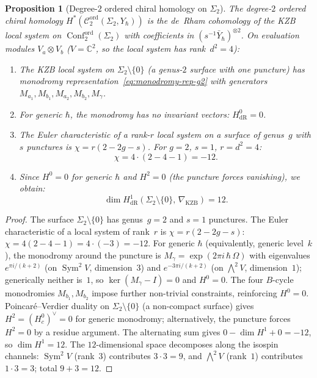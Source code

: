 \documentclass[11pt,reqno]{amsart}
\newtheorem{proposition}[theorem]{Proposition}
\theoremstyle{definition}
\theoremstyle{remark}
\newcommand{\cC}{\mathcal{C}}
\DeclareMathOperator{\Conf}{Conf}
\newcommand{\CC}{\mathbb{C}}
\numberwithin{equation}{section}
\begin{document}
\begin{proposition}[Degree-$2$ ordered chiral homology on
$\Sigma_2$]
\label{prop:g2-degree2}
The degree-$2$ ordered chiral homology
$H^*(\cC_2^{\mathrm{ord}}(\Sigma_2, Y_\hbar))$ is the
de~Rham cohomology of the KZB local system on
$\Conf_2^{\mathrm{ord}}(\Sigma_2)$ with coefficients in
$(s^{-1}\bar{Y}_\hbar)^{\otimes 2}$.
On evaluation modules $V_a \otimes V_b$
\textup{(}$V = \CC^2$, so the local system has
rank~$d^2 = 4$\textup{)}:
\begin{enumerate}[label=\textup{(\roman*)}]
\item The KZB local system on
  $\Sigma_2 \setminus \{0\}$ \textup{(}a genus-$2$ surface
  with one puncture\textup{)} has monodromy
  representation~\eqref{eq:monodromy-rep-g2} with generators
  $M_{a_1}, M_{b_1}, M_{a_2}, M_{b_2}, M_\gamma$.
\item For generic $\hbar$, the monodromy has no invariant
  vectors: $H^0_{\mathrm{dR}} = 0$.
\item The Euler characteristic of a rank-$r$ local system on
  a surface of genus~$g$ with $s$ punctures is
  $\chi = r(2 - 2g - s)$. For $g = 2$, $s = 1$,
  $r = d^2 = 4$:
  \begin{equation}\label{eq:g2-degree2-euler}
    \chi = 4 \cdot (2 - 4 - 1) = -12.
  \end{equation}
\item Since $H^0 = 0$ for generic $\hbar$ and
  $H^2 = 0$ \textup{(}the puncture forces vanishing\textup{)},
  we obtain:
  \begin{equation}\label{eq:g2-degree2-h1}
    \dim H^1_{\mathrm{dR}}(\Sigma_2 \setminus \{0\},\,
    \nabla_{\mathrm{KZB}}) = 12.
  \end{equation}
\end{enumerate}
\end{proposition}

\begin{proof}
The surface $\Sigma_2 \setminus \{0\}$ has genus~$g = 2$ and
$s = 1$ punctures. The Euler characteristic of a local system
of rank~$r$ is $\chi = r(2 - 2g - s)$:
$\chi = 4(2 - 4 - 1) = 4 \cdot (-3) = -12$.
For generic $\hbar$ (equivalently, generic level~$k$), the
monodromy around the puncture is
$M_\gamma = \exp(2\pi i\,\hbar\,\Omega)$ with eigenvalues
$e^{\pi i/(k+2)}$ (on $\operatorname{Sym}^2 V$, dimension~$3$)
and $e^{-3\pi i/(k+2)}$ (on $\bigwedge^2 V$, dimension~$1$);
generically neither is~$1$, so
$\ker(M_\gamma - I) = 0$ and $H^0 = 0$.
The four $B$-cycle monodromies $M_{b_1}, M_{b_2}$ impose
further non-trivial constraints, reinforcing $H^0 = 0$.
Poincar\'e--Verdier duality on $\Sigma_2 \setminus \{0\}$
(a non-compact surface) gives
$H^2 = (H^0_c)^\vee = 0$ for generic
monodromy; alternatively, the puncture forces $H^2 = 0$ by
a residue argument.
The alternating sum gives
$0 - \dim H^1 + 0 = -12$, so $\dim H^1 = 12$.
The $12$-dimensional space decomposes along the isospin
channels:
$\operatorname{Sym}^2 V$ (rank~$3$) contributes
$3 \cdot 3 = 9$, and $\bigwedge^2 V$ (rank~$1$) contributes
$1 \cdot 3 = 3$; total $9 + 3 = 12$.
\end{proof}
\end{document}
